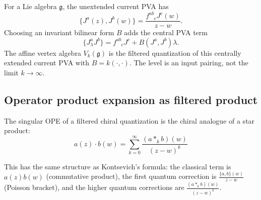 \begin{example}
For a Lie algebra $\mathfrak g$, the unextended current PVA has
\[
\{J^a(z),J^b(w)\}=\frac{f^{ab}_{\phantom{ab}c}J^c(w)}{z-w}.
\]
Choosing an invariant bilinear form \(B\) adds the central PVA term
\[
\{J^a_\lambda J^b\}=f^{ab}_{\phantom{ab}c}J^c+B(J^a,J^b)\lambda .
\]
The affine vertex algebra \(V_k(\mathfrak g)\) is the filtered
quantization of this centrally extended current PVA with
\(B=k(\cdot,\cdot)\). The level is an input pairing, not the limit
\(k\to\infty\).
\end{example}

\subsection{Operator product expansion as filtered product}

The singular OPE of a filtered chiral quantization is the chiral
analogue of a star product:
\[a(z) \cdot b(w) = \sum_{k=0}^\infty \frac{(a *_k b)(w)}{(z-w)^k}\]

This has the same structure as Kontsevich's formula: the classical term is $a(z)b(w)$ (commutative product), the first quantum correction is $\frac{\{a, b\}(w)}{z-w}$ (Poisson bracket), and the higher quantum corrections are $\frac{(a *_k b)(w)}{(z-w)^k}$.


